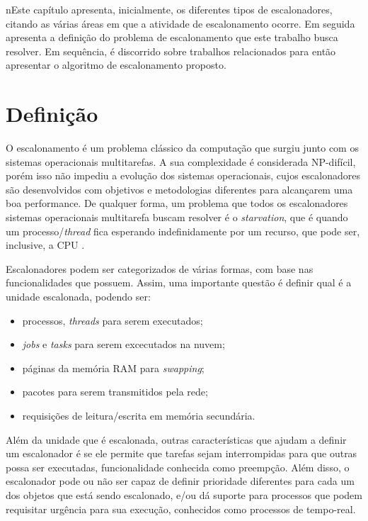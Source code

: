 nEste capítulo apresenta, inicialmente, os diferentes tipos de escalonadores, citando as várias áreas em que a atividade de escalonamento ocorre. Em seguida apresenta a definição do problema de escalonamento que este trabalho busca resolver. Em sequência, é discorrido sobre trabalhos relacionados para então apresentar o algoritmo de escalonamento proposto.

\section{Definição}

O escalonamento é um problema clássico da computação que surgiu junto com os sistemas operacionais multitarefas. A sua complexidade é considerada NP-difícil\cite{ULLMAN1975384}, porém isso não impediu a evolução dos sistemas operacionais, cujos escalonadores são desenvolvidos com objetivos e metodologias diferentes para alcançarem uma boa performance. De qualquer forma, um problema que todos os escalonadores sistemas operacionais multitarefa buscam resolver é o \textit{starvation}, que é quando um processo/\textit{thread} fica esperando indefinidamente por um recurso, que pode ser, inclusive, a \acrshort{CPU} \cite{TANEMBAUM_SO}.

Escalonadores podem ser categorizados de várias formas, com base nas funcionalidades que possuem. Assim, uma importante questão é definir qual é a unidade escalonada, podendo ser\cite{TANEMBAUM_SO}:

	\begin{itemize}
		\item processos, \textit{threads} para serem executados;
		\item \textit{jobs} e \textit{tasks} para serem excecutados na nuvem;
		\item páginas da memória \acrfull{RAM} para \textit{swapping};
		\item pacotes para serem transmitidos pela rede;
		\item requisições de leitura/escrita em memória secundária.
	\end{itemize}

	Além da unidade que é escalonada, outras características que ajudam a definir um escalonador é se ele permite que tarefas sejam interrompidas para que outras possa ser executadas, funcionalidade conhecida como preempção. Além disso, o escalonador pode ou não ser capaz de definir prioridade diferentes para cada um dos objetos que está sendo escalonado, e/ou dá suporte para processos que podem requisitar urgência para sua execução, conhecidos como processos de tempo-real\cite{TANEMBAUM_SO}.

